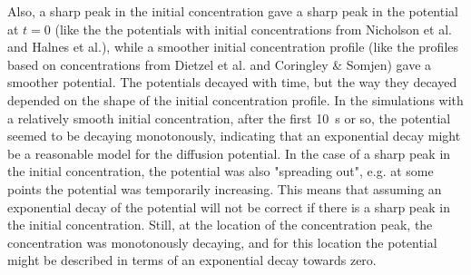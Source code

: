 \documentclass{uiophd}
\begin{document}
Also, a sharp peak in the initial concentration gave a sharp peak in the potential at $t=0$ (like the the potentials with initial concentrations from Nicholson et al. and Halnes et al.), while a smoother initial concentration profile (like the profiles based on concentrations from Dietzel et al. and Coringley \& Somjen) gave a smoother potential. The potentials decayed with time, but the way they decayed depended on the shape of the initial concentration profile. In the simulations with a relatively smooth initial concentration, after the first 10~s or so, the potential seemed to be decaying monotonously, indicating that an exponential decay might be a reasonable model for the diffusion potential. In the case of a sharp peak in the initial concentration, the potential was also "spreading out", e.g. at some points the potential was temporarily increasing. This means that assuming an exponential decay of the potential will not be correct if there is a sharp peak in the initial concentration. Still, at the location of the concentration peak, the concentration was monotonously decaying, and for this location the potential might be described in terms of an exponential decay towards zero. 
\end{document}

